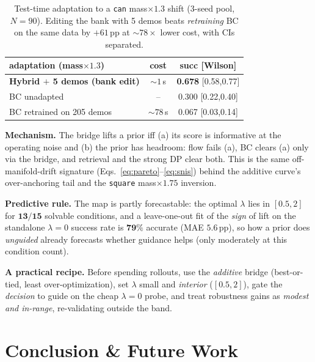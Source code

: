 \documentclass[letterpaper, 10 pt, conference]{ieeeconf}
\begin{document}
\begin{table}[h]
\centering\scriptsize
\setlength{\tabcolsep}{4pt}
\renewcommand{\arraystretch}{0.95}
\caption{Test-time adaptation to a \texttt{can} mass$\times1.3$ shift (3-seed pool,
$N\!=\!90$). Editing the bank with 5 demos beats \emph{retraining} BC on
the same data by $+61$\,pp at $\sim\!78\times$ lower cost, with CIs separated.}
\label{tab:adapt}
\begin{tabular}{@{}lcc@{}}
\hline
adaptation (mass$\times1.3$) & cost & succ [Wilson] \\
\hline
\textbf{Hybrid $+$ 5 demos (bank edit)} & $\sim\!1$\,s & \textbf{0.678} [0.58,0.77] \\
BC unadapted                            & --           & 0.300 [0.22,0.40] \\
BC retrained on 205 demos               & $\sim\!78$\,s & 0.067 [0.03,0.14] \\
\hline
\end{tabular}
\end{table}

\textbf{Mechanism.} The bridge lifts a prior iff (a) its score is
informative at the operating noise and (b) the prior has headroom: flow
fails (a), BC clears (a) only via the bridge, and retrieval and the strong
DP clear both. This is the same off-manifold-drift signature
(Eqs.~\ref{eq:pareto}--\ref{eq:snis}) behind the additive curve's
over-anchoring tail and the \texttt{square} mass$\times1.75$ inversion.

\textbf{Predictive rule.} The map is partly forecastable: the optimal
$\lambda$ lies in $[0.5,2]$ for $\mathbf{13/15}$ solvable conditions, and a
leave-one-out fit of the \emph{sign} of lift on the standalone $\lambda\!=\!0$
success rate is $\mathbf{79\%}$ accurate (MAE $5.6$\,pp), so how a prior
does \emph{unguided} already forecasts whether guidance helps (only
moderately at this condition count).

\textbf{A practical recipe.} Before spending rollouts, use the
\emph{additive} bridge (best-or-tied, least over-optimization), set
$\lambda$ small and \emph{interior} ($[0.5,2]$), gate the \emph{decision} to
guide on the cheap $\lambda\!=\!0$ probe, and treat robustness gains as
\emph{modest and in-range}, re-validating outside the band.

\section{Conclusion \& Future Work}
\end{document}
